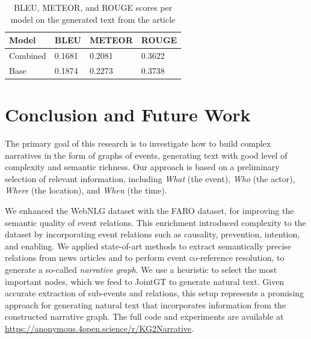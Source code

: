 \documentclass[
hf, %
]{ceurart}
\begin{document}
\begin{table}[]
\centering
\begin{tabular}{|l|l|l|l|}
\hline
\textbf{Model} & \textbf{BLEU} & \textbf{METEOR} & \textbf{ROUGE} \\ \hline
Combined       & 0.1681        & 0.2081          & 0.3622         \\ \hline
Base           & 0.1874        & 0.2273          & 0.3738         \\ \hline
\end{tabular}
\caption{BLEU, METEOR, and ROUGE scores per model on the generated text from the article}
\label{tab:article_auto_metrics}
\end{table}

\section{Conclusion and Future Work}
\label{sec:conclusion}
The primary goal of this research is to investigate how to build complex narratives in the form of graphs of events, generating text with good level of complexity and semantic richness. Our approach is based on a preliminary selection of relevant information, including \textit{What} (the event), \textit{Who} (the actor), \textit{Where} (the location), and \textit{When} (the time).

We enhanced the WebNLG dataset with the FARO dataset, for improving the semantic quality of event relations. This enrichment introduced complexity to the dataset by incorporating event relations such as causality, prevention, intention, and enabling. We applied state-of-art methods to extract semantically precise relations from news articles and to perform event co-reference resolution, to generate a so-called \textit{narrative graph}. We use a heuristic to select the most important nodes, which we feed to JointGT to generate natural text. Given accurate extraction of sub-events and relations, this setup represents a promising approach for generating natural text that incorporates information from the constructed narrative graph. The full code and experiments are available at \url{https://anonymous.4open.science/r/KG2Narrative}.
\end{document}
